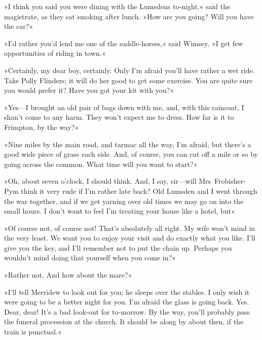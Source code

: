 \divider
»I think you said you were dining with the Lumsdens to-night,« said the magistrate, as they sat smoking after lunch. »How are you going? Will you have the car?«

»I'd rather you'd lend me one of the saddle-horses,« said Wimsey. »I get few opportunities of riding in town.«

»Certainly, my dear boy, certainly. Only I'm afraid you'll have rather a wet ride. Take Polly Flinders; it will do her good to get some exercise. You are quite sure you would prefer it? Have you got your kit with you?«

»Yes—I brought an old pair of bags down with me, and, with this raincoat, I shan't come to any harm. They won't expect me to dress. How far is it to Frimpton, by the way?«

»Nine miles by the main road, and tarmac all the way, I'm afraid, but there's a good wide piece of grass each side. And, of course, you can cut off a mile or so by going across the common. What time will you want to start?«

»Oh, about seven o'clock, I should think. And, I say, sir—will Mrs~Frobisher-Pym think it very rude if I'm rather late back? Old Lumsden and I went through the war together, and if we get yarning over old times we may go on into the small hours. I don't want to feel I'm treating your house like a hotel, but\longdash«

»Of course not, of course not! That's absolutely all right. My wife won't mind in the very least. We want you to enjoy your visit and do exactly what you like. I'll give you the key, and I'll remember not to put the chain up. Perhaps you wouldn't mind doing that yourself when you come in?«

»Rather not. And how about the mare?«

»I'll tell Merridew to look out for you; he sleeps over the stables. I only wish it were going to be a better night for you. I'm afraid the glass is going back. Yes. Dear, dear! It's a bad look-out for to-morrow. By the way, you'll probably pass the funeral procession at the church. It should be along by about then, if the train is punctual.«

